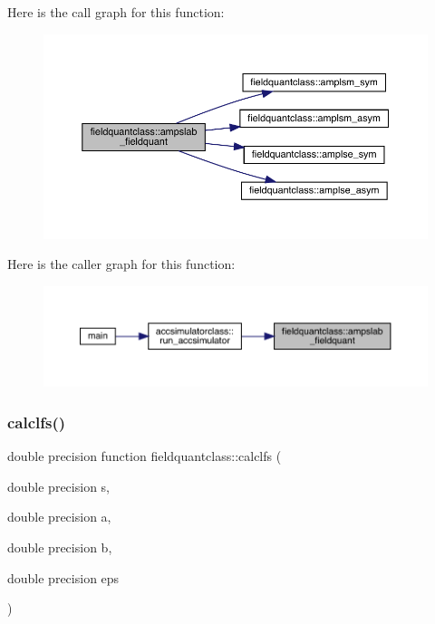 Here is the call graph for this function\+:\nopagebreak
\begin{figure}[H]
\begin{center}
\leavevmode
\includegraphics[width=350pt]{namespacefieldquantclass_ac5166a3094bb6567db04903c1f43e4b6_cgraph}
\end{center}
\end{figure}
Here is the caller graph for this function\+:\nopagebreak
\begin{figure}[H]
\begin{center}
\leavevmode
\includegraphics[width=350pt]{namespacefieldquantclass_ac5166a3094bb6567db04903c1f43e4b6_icgraph}
\end{center}
\end{figure}
\mbox{\label{namespacefieldquantclass_a491cfca134ed1bb2dfc47d6de7fdd972}} 
\subsubsection{\texorpdfstring{calclfs()}{calclfs()}}
{\footnotesize\ttfamily double precision function fieldquantclass\+::calclfs (\begin{DoxyParamCaption}\item[{double precision}]{s,  }\item[{double precision}]{a,  }\item[{double precision}]{b,  }\item[{double precision}]{eps }\end{DoxyParamCaption})}


